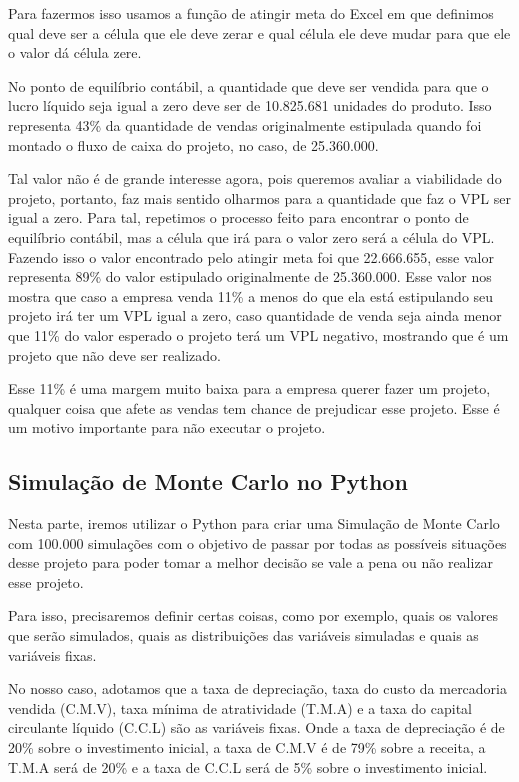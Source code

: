 \documentclass[a4paper,12pt]{article}[abntex2]
\begin{document}
Para fazermos isso usamos a função de atingir meta do Excel em que definimos qual deve ser a célula que ele deve zerar e qual célula ele deve mudar para que ele o valor dá célula zere.

No ponto de equilíbrio contábil, a quantidade que deve ser vendida para que o lucro líquido seja igual a zero deve ser de 10.825.681 unidades do produto. Isso representa 43\% da quantidade de vendas originalmente estipulada quando foi montado o fluxo de caixa do projeto, no caso, de 25.360.000.

Tal valor não é de grande interesse agora, pois queremos avaliar a viabilidade do projeto, portanto, faz mais sentido olharmos para a quantidade que faz o VPL ser igual a zero. Para tal, repetimos o processo feito para encontrar o ponto de equilíbrio contábil, mas a célula que irá para o valor zero será a célula do VPL. Fazendo isso o valor encontrado pelo atingir meta foi que 22.666.655, esse valor representa 89\% do valor estipulado originalmente de 25.360.000. Esse valor nos mostra que caso a empresa venda 11\% a menos do que ela está estipulando seu projeto irá ter um VPL igual a zero, caso quantidade de venda seja ainda menor que 11\% do valor esperado o projeto terá um VPL negativo, mostrando que é um projeto que não deve ser realizado.

Esse 11\% é uma margem muito baixa para a empresa querer fazer um projeto, qualquer coisa que afete as vendas tem chance de prejudicar esse projeto. Esse é um motivo importante para não executar o projeto.

\subsection{\textbf{Simulação de Monte Carlo no Python}}
Nesta parte, iremos utilizar o Python para criar uma Simulação de Monte Carlo com 100.000 simulações com o objetivo de passar por todas as possíveis situações desse projeto para poder tomar a melhor decisão se vale a pena ou não realizar esse projeto.

Para isso, precisaremos definir certas coisas, como por exemplo, quais os valores que serão simulados, quais as distribuições das variáveis simuladas e quais as variáveis fixas.

No nosso caso, adotamos que a taxa de depreciação, taxa do custo da mercadoria vendida (C.M.V), taxa mínima de atratividade (T.M.A) e a taxa do capital circulante líquido (C.C.L) são as variáveis fixas. Onde a taxa de depreciação é de 20\% sobre o investimento inicial, a taxa de C.M.V é de 79\% sobre a receita, a T.M.A será de 20\% e a taxa de C.C.L será de 5\% sobre o investimento inicial.
\end{document}
